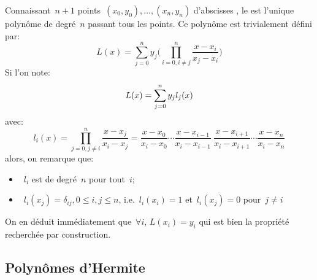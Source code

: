 Connaissant~$n + 1$ points~$(x_0, y_0),\dots,(x_n, y_n)$ d'abscisses , le  est l'unique polynôme de degré~$n$ passant tous les points. Ce polynôme est trivialement défini par: 
\begin{equation}
L(x) = \sum_{j=0}^{n} y_j \biggl(\prod_{i=0, i\neq j}^{n} \frac{x-x_i}{x_j-x_i} \biggr) 
\end{equation}
Si l'on note:
\begin{equation}
L(x) = \displaystyle\sum_{j=0}^{n} y_j l_j(x)
\end{equation}
avec:
\begin{equation}
l_i(x) = \prod_{j=0, j\neq i}^{n} \frac{x-x_j}{x_i-x_j} = \frac{x-x_0}{x_i-x_0} \cdots \frac{x-x_{i-1}}{x_i-x_{i-1}} ~ \frac{x-x_{i+1}}{x_i-x_{i+1}} \cdots \frac{x-x_{n}}{x_i-x_{n}}
\end{equation}
alors, on remarque que: 
\begin{itemize}
\item~$l_i$ est de degré~$n$ pour tout~$i$; 
\item~$l_i(x_j) = \delta_{ij}, 0 \leq i,j \leq n$, i.e.~$l_i(x_i) = 1$ et~$l_i(x_j) = 0$ pour~$j\ne i$ 
\end{itemize}
On en déduit immédiatement que~$\forall i$, $L(x_i) = y_i$ qui est bien la propriété recherchée par construction. 

\medskip
\subsection{Polynômes d'Hermite}\label{Sec-PolHermite}

